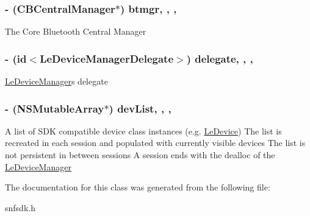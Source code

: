 \subsubsection[{btmgr}]{\setlength{\rightskip}{0pt plus 5cm}-\/ (C\+B\+Central\+Manager$\ast$) btmgr\hspace{0.3cm}{\ttfamily [read]}, {\ttfamily [write]}, {\ttfamily [nonatomic]}, {\ttfamily [assign]}}\label{interface_le_device_manager_a6d2af12cf6c4f9473bd7bc4068770ddd}
The Core Bluetooth Central Manager \hypertarget{interface_le_device_manager_ac2ed7dcffc6d3fa1f1ab67cb6ed302f0}{}
\subsubsection[{delegate}]{\setlength{\rightskip}{0pt plus 5cm}-\/ (id$<${\bf Le\+Device\+Manager\+Delegate}$>$) delegate\hspace{0.3cm}{\ttfamily [read]}, {\ttfamily [write]}, {\ttfamily [nonatomic]}, {\ttfamily [strong]}}\label{interface_le_device_manager_ac2ed7dcffc6d3fa1f1ab67cb6ed302f0}
\hyperlink{interface_le_device_manager}{Le\+Device\+Manager}\textquotesingle{}s delegate \hypertarget{interface_le_device_manager_a82f221588b5f9c8d9a9b823bcea56886}{}
\subsubsection[{dev\+List}]{\setlength{\rightskip}{0pt plus 5cm}-\/ (N\+S\+Mutable\+Array$\ast$) dev\+List\hspace{0.3cm}{\ttfamily [read]}, {\ttfamily [write]}, {\ttfamily [nonatomic]}, {\ttfamily [strong]}}\label{interface_le_device_manager_a82f221588b5f9c8d9a9b823bcea56886}
A list of S\+D\+K compatible device class instances (e.\+g. \hyperlink{interface_le_device}{Le\+Device}) The list is recreated in each session and populated with currently visible devices The list is not persistent in between sessions A session ends with the dealloc of the \hyperlink{interface_le_device_manager}{Le\+Device\+Manager} 

The documentation for this class was generated from the following file\+:\begin{DoxyCompactItemize}
\item 
snfsdk.\+h\end{DoxyCompactItemize}
